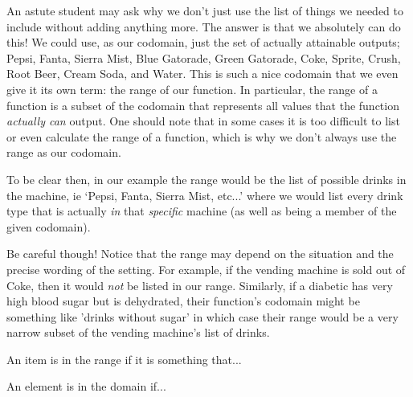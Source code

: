 \documentclass{ximeraXloud}
\begin{document}
An astute student may ask why we don't just use the list of things we needed to include without adding anything more. The answer is that we absolutely can do this! We could use, as our codomain, just the set of actually attainable outputs; Pepsi, Fanta, Sierra Mist, Blue Gatorade, Green Gatorade, Coke, Sprite, Crush, Root Beer, Cream Soda, and Water. This is such a nice codomain that we even give it its own term: the range of our function. In particular, the range of a function is a subset of the codomain that represents all values that the function \textit{actually can} output. One should note that in some cases it is too difficult to list or even calculate the range of a function, which is why we don't always use the range as our codomain.

To be clear then, in our example the range would be the list of possible drinks in the machine, ie `Pepsi, Fanta, Sierra Mist, etc...' where we would list every drink type that is actually \textit{in} that \textit{specific} machine (as well as being a member of the given codomain).

Be careful though! Notice that the range may depend on the situation and the precise wording of the setting. For example, if the vending machine is sold out of Coke, then it would \textit{not} be listed in our range. Similarly, if a diabetic has very high blood sugar but is dehydrated, their function's codomain might be something like 'drinks without sugar' in which case their range would be a very narrow subset of the vending machine's list of drinks.


\begin{question}
    An item is in the range if it is something that...
    \begin{multipleChoice}
    \end{multipleChoice}
\end{question}

\begin{question}
    An element is in the domain if...
    \begin{multipleChoice}
    \end{multipleChoice}
\end{question}
\end{document}
